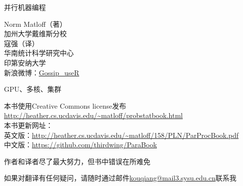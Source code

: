 \pagecolor{yellow}
\color{black}

\bigskip
\vspace{0.5in}
\bigskip
\begin{center}
{\Huge 并行机器编程}

{\LARGE Norm Matloff（著）\\
加州大学戴维斯分校\\
\bigskip
寇强（译）\\
\vspace{1 mm}
华南统计科学研究中心\\
\vspace{1 mm}
印第安纳大学\\
\vspace{3 mm}
新浪微博：\href{http://www.weibo.com/thirdwing}{Gossip\_useR}
}





\bigskip

\vspace{0.5in}

{\LARGE GPU、多核、集群}
\end{center}
\vspace{1in}



\vspace{1.5in}
\noindent 本书使用Creative Commons license发布\\
\url{http://heather.cs.ucdavis.edu/~matloff/probstatbook.html}\\
\medskip
\noindent 本书更新网址：\\
英文版：\url{http://heather.cs.ucdavis.edu/~matloff/158/PLN/ParProcBook.pdf}\\
中文版：\url{https://github.com/thirdwing/ParaBook}

\medskip
\noindent 作者和译者尽了最大努力，但书中错误在所难免

\noindent 如果对翻译有任何疑问，请随时通过邮件\href{mailto:kouqiang@mail3.sysu.edu.cn}{kouqiang@mail3.sysu.edu.cn}联系我
\newpage
